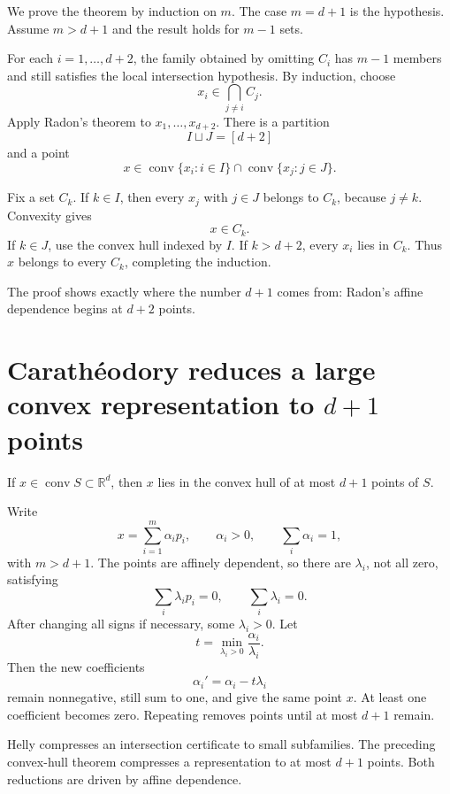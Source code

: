 We prove the theorem by induction on \(m\).  The case \(m=d+1\) is the hypothesis.  Assume \(m>d+1\) and the result holds for \(m-1\) sets.

For each \(i=1,\ldots,d+2\), the family obtained by omitting \(C_i\) has \(m-1\) members and still satisfies the local intersection hypothesis.  By induction, choose
\[
  x_i\in\bigcap_{j\ne i}C_j.
\]
Apply Radon's theorem to \(x_1,\ldots,x_{d+2}\).  There is a partition
\[
  I\sqcup J=[d+2]
\]
and a point
\[
  x\in\operatorname{conv}\{x_i:i\in I\}
  \cap
  \operatorname{conv}\{x_j:j\in J\}.
\]

Fix a set \(C_k\).  If \(k\in I\), then every \(x_j\) with \(j\in J\) belongs to \(C_k\), because \(j\ne k\).  Convexity gives
\[
  x\in C_k.
\]
If \(k\in J\), use the convex hull indexed by \(I\).  If \(k>d+2\), every \(x_i\) lies in \(C_k\).  Thus \(x\) belongs to every \(C_k\), completing the induction.

The proof shows exactly where the number \(d+1\) comes from: Radon's affine dependence begins at \(d+2\) points.

\section{Carathéodory reduces a large convex representation to \texorpdfstring{$d+1$}{d+1} points}

\begin{theorem}[Carathéodory]
If \(x\in\operatorname{conv}S\subset\mathbb R^d\), then \(x\) lies in the convex hull of at most \(d+1\) points of \(S\).
\end{theorem}

Write
\[
  x=\sum_{i=1}^m\alpha_i p_i,
  \qquad
  \alpha_i>0,
  \qquad
  \sum_i\alpha_i=1,
\]
with \(m>d+1\).  The points are affinely dependent, so there are \(\lambda_i\), not all zero, satisfying
\[
  \sum_i\lambda_i p_i=0,
  \qquad
  \sum_i\lambda_i=0.
\]
After changing all signs if necessary, some \(\lambda_i>0\).  Let
\[
  t=\min_{\lambda_i>0}\frac{\alpha_i}{\lambda_i}.
\]
Then the new coefficients
\[
  \alpha_i'=\alpha_i-t\lambda_i
\]
remain nonnegative, still sum to one, and give the same point \(x\).  At least one coefficient becomes zero.  Repeating removes points until at most \(d+1\) remain.

Helly compresses an intersection certificate to small subfamilies.  The preceding convex-hull theorem compresses a representation to at most \(d+1\) points.  Both reductions are driven by affine dependence.

